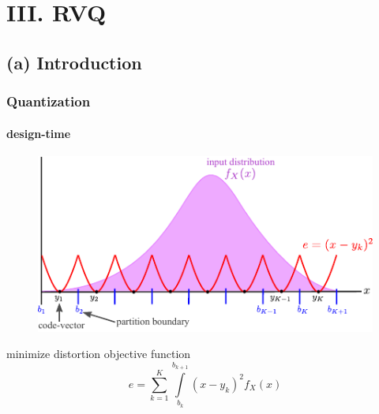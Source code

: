 \section{III. RVQ}
\subsection{(a) Introduction}
\begin{frame}
\frametitle{Quantization}
\framesubtitle{design-time}
\mypagenum
\begin{figure}				
\includegraphics[width=1.0\textwidth]{thesis/Quantization_design_time.pdf}
\end{figure}
minimize distortion objective function
\begin{equation*}
e=\sum\limits_{k=1}^{K} \int\limits_{b_k}^{b_{k+1}}(x-y_k)^2f_X(x)
\end{equation*}
\end{frame}




